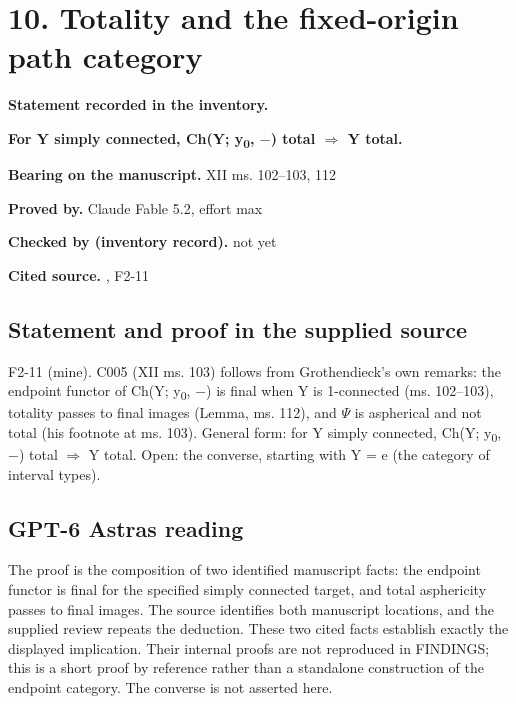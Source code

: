 \par\bigskip

\section*{10. Totality and the fixed-origin path category}


\label{nr:entry10}

\noindent\textbf{Statement recorded in the inventory.}\par\smallskip

\textbf{For Y simply connected, Ch(Y; y\textsubscript{0}, \ensuremath{-}) total \ensuremath{\Rightarrow} Y total.}


\noindent\textbf{Bearing on the manuscript.} XII ms. 102--103, 112\par\smallskip

\noindent\textbf{Proved by.} Claude Fable 5.2, effort max\par

\noindent\textbf{Checked by (inventory record).} not yet\par\smallskip

\noindent\textbf{Cited source.} , F2-11\par\medskip

\subsection*{Statement and proof in the supplied source}

F2-11 (mine). C005 (XII ms. 103) follows from Grothendieck's own remarks: the endpoint functor of   Ch(Y; y\textsubscript{0}, \ensuremath{-}) is final when Y is 1-connected (ms. 102--103), totality passes to final images (Lemma, ms. 112),   and \ensuremath{\Psi} is aspherical and not total (his footnote at ms. 103). General form: for Y simply connected,   Ch(Y; y\textsubscript{0}, \ensuremath{-}) total \ensuremath{\Rightarrow} Y total. Open: the converse, starting with Y = e (the category of interval types).


\subsection*{GPT-6 Astra\textquotesingle s reading}

The proof is the composition of two identified manuscript facts: the endpoint functor is final for the specified simply connected target, and total asphericity passes to final images. The source identifies both manuscript locations, and the supplied review repeats the deduction. These two cited facts establish exactly the displayed implication. Their internal proofs are not reproduced in FINDINGS; this is a short proof by reference rather than a standalone construction of the endpoint category. The converse is not asserted here.

